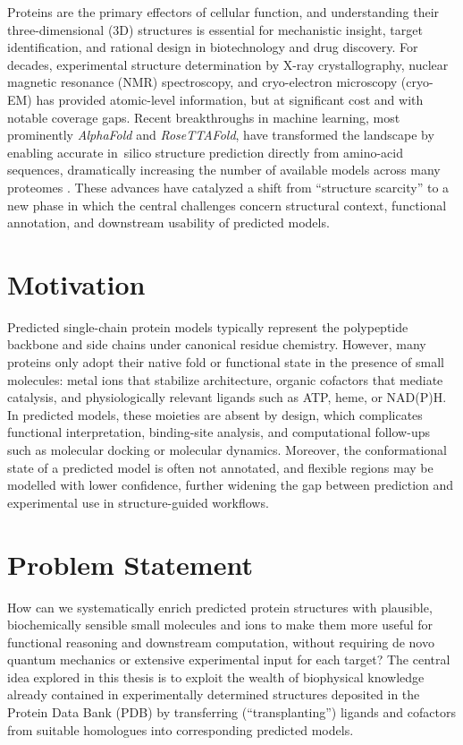 \label{chap:introduction}

Proteins are the primary effectors of cellular function, and understanding their three-dimensional (3D) structures is essential for mechanistic insight, target identification, and rational design in biotechnology and drug discovery. For decades, experimental structure determination by X-ray crystallography, nuclear magnetic resonance (NMR) spectroscopy, and cryo-electron microscopy (cryo-EM) has provided atomic-level information, but at significant cost and with notable coverage gaps. Recent breakthroughs in machine learning, most prominently \textit{AlphaFold} and \textit{RoseTTAFold}, have transformed the landscape by enabling accurate in~silico structure prediction directly from amino-acid sequences, dramatically increasing the number of available models across many proteomes \cite{jumperHighlyAccurateProtein2021, baekAccuratePredictionProtein2021,tunyasuvunakoolHighlyAccurateProtein2021}. These advances have catalyzed a shift from ``structure scarcity'' to a new phase in which the central challenges concern structural context, functional annotation, and downstream usability of predicted models.

\section{Motivation}
Predicted single-chain protein models typically represent the polypeptide backbone and side chains under canonical residue chemistry. However, many proteins only adopt their native fold or functional state in the presence of small molecules: metal ions that stabilize architecture, organic cofactors that mediate catalysis, and physiologically relevant ligands such as ATP, heme, or NAD(P)H. In predicted models, these moieties are absent by design, which complicates functional interpretation, binding-site analysis, and computational follow-ups such as molecular docking or molecular dynamics. Moreover, the conformational state of a predicted model is often not annotated, and flexible regions may be modelled with lower confidence, further widening the gap between prediction and experimental use in structure-guided workflows.

\section{Problem Statement}
How can we systematically enrich predicted protein structures with plausible, biochemically sensible small molecules and ions to make them more useful for functional reasoning and downstream computation, without requiring de novo quantum mechanics or extensive experimental input for each target? The central idea explored in this thesis is to exploit the wealth of biophysical knowledge already contained in experimentally determined structures deposited in the Protein Data Bank (PDB) \cite{burleyRCSBProteinData2018} by transferring (``transplanting'') ligands and cofactors from suitable homologues into corresponding predicted models.


